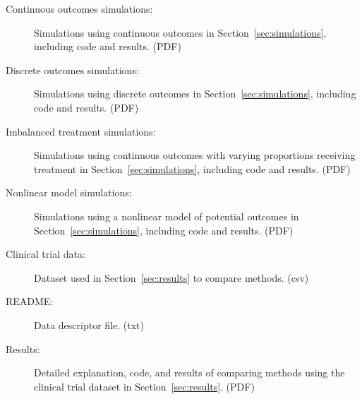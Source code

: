 \documentclass[12pt]{article}
\begin{document}
\begin{description}

\item[Continuous outcomes simulations:] Simulations using continuous outcomes in Section~\ref{sec:simulations}, including code and results. (PDF)
\item[Discrete outcomes simulations:] Simulations using discrete outcomes in Section~\ref{sec:simulations}, including code and results. (PDF)
\item[Imbalanced treatment simulations:] Simulations using continuous outcomes with varying proportions receiving treatment in Section~\ref{sec:simulations}, including code and results. (PDF)
\item[Nonlinear model simulations:] Simulations using a nonlinear model of potential outcomes in Section~\ref{sec:simulations}, including code and results. (PDF)
\item[Clinical trial data:] Dataset used in Section~\ref{sec:results} to compare methods. (csv)
\item[README:] Data descriptor file. (txt)
\item[Results:] Detailed explanation, code, and results of comparing methods using the clinical trial dataset in Section~\ref{sec:results}. (PDF)

\end{description}




\end{document}
